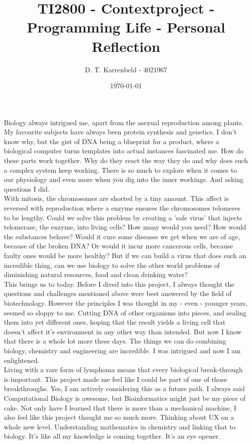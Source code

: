 \documentclass{article}
\title{TI2800 - Contextproject - Programming Life - Personal Reflection}
\author{D. T. Karrenbeld - 4021967}
\date{\today}
\begin{document}
	\maketitle
Biology always intrigued me, apart from the asexual reproduction among plants. My favourite subjects have always been protein synthesis and genetics. I don't know why, but the gist of DNA being a blueprint for a product, where a biological computer turns templates into actual instances fascinated me. How do these parts work together. Why do they react the way they do and why does such a complex system keep working. There is so much to explore when it comes to our physiology and even more when you dig into the inner workings. And asking questions I did.\\

With mitosis, the chromosomes are shorted by a tiny amount. This affect is reversed with reproduction where a enzyme ensures the chromosomes telomeres to be lengthy. Could we solve this problem by creating a 'safe virus' that injects telomerase, the enzyme, into living cells? How many would you need? How would the substances behave? Would it cure some diseases we get when we are of age, because of the broken DNA? Or would it incur more cancerous cells, because faulty ones would be more healthy? But if we can build a virus that does such an incredible thing, can we use biology to solve the other world problems of diminishing natural resources, food and clean drinking water? \\

This brings us to today. Before I dived into this project, I always thought the questions and challenges mentioned above were best answered by the field of biotechnology. However the principles I was thought in my - even - younger years, seemed so sloppy to me. Cutting DNA of other organisms into pieces, and sealing them into yet different ones, hoping that the result yields a living cell that doesn't affect it's environment in any other way than intended. But now I know that there is a whole lot more these days. The things we can do combining biology, chemistry and engineering are incredible. I was intrigued and now I am enlightened. \\

Living with a rare form of lymphoma means that every biological break-through is important. This project made me feel like I could be part of one of those breakthroughs. Yes, I am actively considering this as a future path. I always said Computational Biology is awesome, but Bioinformatics might just be my piece of cake. Not only have I learned that there is more than a mechanical machine, I also feel like this project thought me so much more. Thinking about UX on a whole new level. Understanding mathematics in chemistry and linking that to biology. It's like all my knowledge is coming together. It's an eye opener.\\
\end{document}
